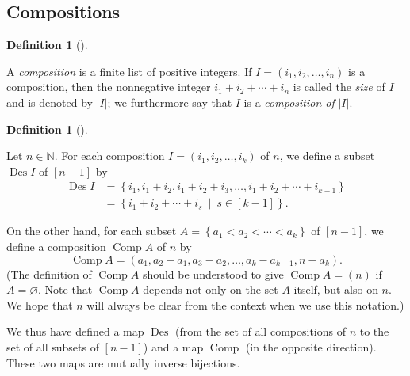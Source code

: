 \documentclass[numbers=enddot,12pt,final,onecolumn,notitlepage]{scrartcl}%
\theoremstyle{definition}
\newtheorem{defi}[theo]{Definition}
\newenvironment{definition}[1][]
{\begin{defi}[#1]\begin{leftbar}}
{\end{leftbar}\end{defi}}
\begin{document}
\subsection{Compositions}

\begin{definition}
A \textit{composition} is a finite list of positive integers. If $I=\left(
i_{1},i_{2},\ldots,i_{n}\right)  $ is a composition, then the nonnegative
integer $i_{1}+i_{2}+\cdots+i_{n}$ is called the \textit{size} of $I$ and is
denoted by $\left\vert I\right\vert $; we furthermore say that $I$ is a
\textit{composition of }$\left\vert I\right\vert $.
\end{definition}

\begin{definition}
\label{def.comps-to-sets}Let $n\in\mathbb{N}$. For each composition $I=\left(
i_{1},i_{2},\ldots,i_{k}\right)  $ of $n$, we define a subset
$\operatorname*{Des}I$ of $\left[  n-1\right]  $ by%
\begin{align*}
\operatorname*{Des}I  &  =\left\{  i_{1},i_{1}+i_{2},i_{1}+i_{2}+i_{3}%
,\ldots,i_{1}+i_{2}+\cdots+i_{k-1}\right\} \\
&  =\left\{  i_{1}+i_{2}+\cdots+i_{s}\ \mid\ s\in\left[  k-1\right]  \right\}
.
\end{align*}


On the other hand, for each subset $A=\left\{  a_{1}<a_{2}<\cdots
<a_{k}\right\}  $ of $\left[  n-1\right]  $, we define a composition
$\operatorname*{Comp}A$ of $n$ by%
\[
\operatorname*{Comp}A=\left(  a_{1},a_{2}-a_{1},a_{3}-a_{2},\ldots
,a_{k}-a_{k-1},n-a_{k}\right)  .
\]
(The definition of $\operatorname*{Comp}A$ should be understood to give
$\operatorname*{Comp}A=\left(  n\right)  $ if $A=\varnothing$. Note that
$\operatorname*{Comp}A$ depends not only on the set $A$ itself, but also on
$n$. We hope that $n$ will always be clear from the context when we use this notation.)

We thus have defined a map $\operatorname*{Des}$ (from the set of all
compositions of $n$ to the set of all subsets of $\left[  n-1\right]  $) and a
map $\operatorname*{Comp}$ (in the opposite direction). These two maps are
mutually inverse bijections.
\end{definition}
\end{document}

